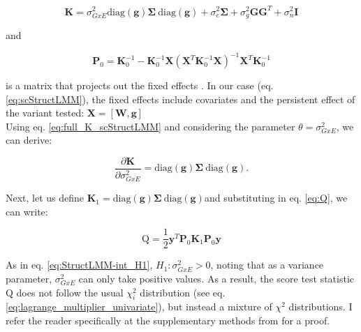 \begin{equation}\label{eq:full_K_scStructLMM}
    \mathbf{K} = \sigma_{GxE}^2\mathrm{diag}(\mathbf{g})\boldsymbol{\Sigma} \ \mathrm{diag}(\mathbf{g}) +  \sigma_e^2 \boldsymbol{\Sigma} + \sigma_g^2 \mathbf{G}\mathbf{G}^T+ \sigma_n^2 \mathbf{I}
\end{equation}

and 

\begin{equation}
    \mathbf{P}_0 = \mathbf{K}_0^{-1}-\mathbf{K}_0^{-1}\mathbf{X}(\mathbf{X}^T\mathbf{K}_0^{-1}\mathbf{X})^{-1}\mathbf{X}^T\mathbf{K}_0^{-1}
\end{equation}

is a matrix that projects out the fixed effects \cite{lippert2011fast, lippert2014greater}.
In our case (eq. \eqref{eq:scStructLMM}), the fixed effects include covariates and the persistent effect of the variant tested: $\mathbf{X} = [\mathbf{W}, \mathbf{g}]$\\

Using eq. \eqref{eq:full_K_scStructLMM} and considering the parameter $\theta = \sigma_{GxE}^2$, we can derive:



\begin{equation}
    \frac{\partial \mathbf{K}}{\partial \sigma_{GxE}^2} = \mathrm{diag}(\mathbf{g})\boldsymbol{\Sigma} \ \mathrm{diag}(\mathbf{g}).
\end{equation}

Next, let us define $\mathbf{K}_1 = \mathrm{diag}(\mathbf{g})\boldsymbol{\Sigma} \ \mathrm{diag}(\mathbf{g})$and substituting in eq. \eqref{eq:Q}, we can write:

\begin{equation}
    \mathrm{Q} = \frac{1}{2}\mathbf{y}^T\mathbf{P}_0 \mathbf{K}_1\mathbf{P}_0 \mathbf{y} 
\end{equation}

As in eq. \eqref{eq:StructLMM-int_H1}, $H_1: \sigma_{GxE}^2>0$, noting that as a variance parameter, $\sigma_{GxE}^2$ can only take positive values.
As a result, the score test statistic $\mathrm{Q}$ does not follow the usual $\chi^2_i$ distribution (see eq. \eqref{eq:lagrange_multiplier_univariate}), but instead a mixture of  $\chi^2$ distributions.
I refer the reader specifically at the supplementary methods from \cite{lippert2014greater} for a proof.

